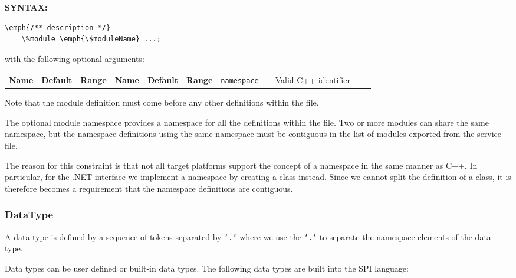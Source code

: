 \textbf{SYNTAX:}
\nopagebreak
\begin{Verbatim}[commandchars=\\\{\}]
    \emph{/** description */}
    \%module \emph{\$moduleName} ...;
\end{Verbatim}

with the following optional arguments:


\small

\begin{longtable}{|p{80pt}|p{150pt}|p{140pt}|l}

 \textbf{Name} & \textbf{Default} & \textbf{Range} & 
\endfirsthead

 \textbf{Name} & \textbf{Default} & \textbf{Range} & 
\endhead

 
\endfoot

\endlastfoot

 \texttt{namespace} &  & Valid C++ identifier \\ 

\end{longtable}
\normalsize
Note that the module definition must come before any other definitions within the file.

The optional module namespace provides a namespace for all the definitions within the file. Two or more modules can share the same namespace, but the namespace definitions using the same namespace must be contiguous in the list of modules exported from the service file.

The reason for this constraint is that not all target platforms support the concept of a namespace in the same manner as C++. In particular, for the .NET interface we implement a namespace by creating a class instead. Since we cannot split the definition of a class, it is therefore becomes a requirement that the namespace definitions are contiguous.


\subsubsection{DataType} \label{dataType}

A data type is defined by a sequence of tokens separated by \texttt{`.'} where we use the \texttt{`.'} to separate the namespace elements of the data type.

Data types can be user defined or built-in data types. The following data types are built into the SPI language:


